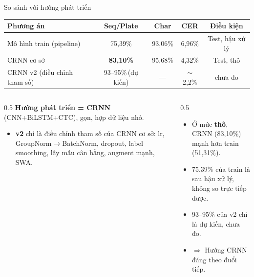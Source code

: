 \documentclass[aspectratio=169,9pt]{beamer}
\begin{document}
\begin{frame}{So sánh với hướng phát triển}
\begin{table}\centering\footnotesize
\begin{tabular}{lcccc}
\toprule
\textbf{Phương án} & \textbf{Seq/Plate} & \textbf{Char} & \textbf{CER} & \textbf{Điều kiện} \\
\midrule
Mô hình train (pipeline) & 75,39\% & 93,06\% & 6,96\% & Test, hậu xử lý \\
CRNN cơ sở & \textbf{83,10\%} & 95,68\% & 4,32\% & Test, thô \\
CRNN v2 (điều chỉnh tham số) & 93--95\%\,(dự kiến) & --- & \(\sim\)2,2\% & chưa đo \\
\bottomrule
\end{tabular}
\end{table}
\begin{columns}[T]
\begin{column}{0.5\textwidth}
{\footnotesize\textbf{Hướng phát triển = CRNN} (CNN+BiLSTM+CTC), gọn, hợp dữ liệu nhỏ.}
\begin{itemize}\scriptsize
  \item \textbf{v2} chỉ là \alert{điều chỉnh tham số} của CRNN cơ sở: lr, GroupNorm\(\to\)BatchNorm, dropout, label smoothing, lấy mẫu cân bằng, augment mạnh, SWA.
\end{itemize}
\end{column}
\begin{column}{0.5\textwidth}
\begin{itemize}\scriptsize
  \item Ở mức \textbf{thô}, CRNN (83,10\%) mạnh hơn train (51,31\%).
  \item 75,39\% của train là sau hậu xử lý, không so trực tiếp được.
  \item 93--95\% của v2 chỉ là dự kiến, chưa đo.
  \item \(\Rightarrow\) Hướng CRNN đáng theo đuổi tiếp.
\end{itemize}
\end{column}
\end{columns}
\end{frame}
\end{document}
